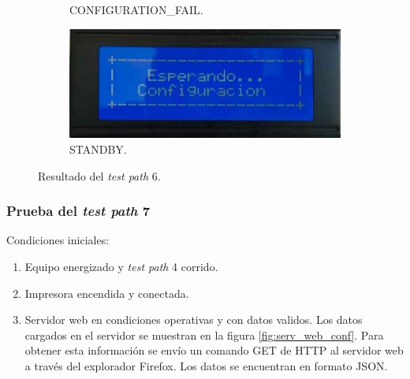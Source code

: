 \begin{figure}[!htpb]
\begin{subfigure}[b]{0.4\textwidth}
         \caption{CONFIGURATION\_FAIL.}
         \label{fig:pruConf_6_3}
     \end{subfigure}
           \hfill
     \begin{subfigure}[b]{0.4\textwidth}
         \centering
         \includegraphics[width=1.1\textwidth]{./Figures/Esp_Conf.jpeg}
         \caption{STANDBY.}
         \label{fig:pruConf_6_4}
     \end{subfigure}
        \caption{Resultado del \textit{test path} 6.}
        \label{fig:pruConf_6_res}
\end{figure}

\pagebreak

\subsubsection{Prueba del \textit{test path} 7}
\label{subsubsec:pruConf_7}

Condiciones iniciales: 

\begin{enumerate}
	\item Equipo energizado y \textit{test path} 4 corrido.
	\item Impresora encendida y conectada.
	\item Servidor web en condiciones operativas y con datos validos. Los datos cargados en el servidor se muestran en la figura \ref{fig:serv_web_conf}. Para obtener esta información se envío un comando GET de HTTP al servidor web a través del explorador Firefox. Los datos se encuentran en formato JSON.
\end{enumerate}

